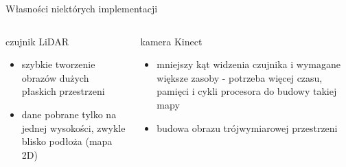 \begin{frame}{Własności niektórych implementacji}
	\begin{columns}
		\begin{column}{0.5\textwidth}
			\begin{center}
				czujnik LiDAR
			\end{center}
			\begin{itemize}
				\item szybkie tworzenie obrazów dużych płaskich przestrzeni
				\item dane pobrane tylko na jednej wysokości, zwykle blisko podłoża (mapa 2D)
			\end{itemize}
		\end{column}
		\begin{column}{0.5\textwidth}  %
			\begin{center}
				kamera Kinect
			\end{center}
			\begin{itemize}
				\item mniejszy kąt widzenia czujnika i wymagane większe zasoby - potrzeba więcej czasu, pamięci i cykli procesora do budowy takiej mapy				
				\item budowa obrazu trójwymiarowej przestrzeni
			\end{itemize}
		\end{column}
	\end{columns}
\end{frame}
